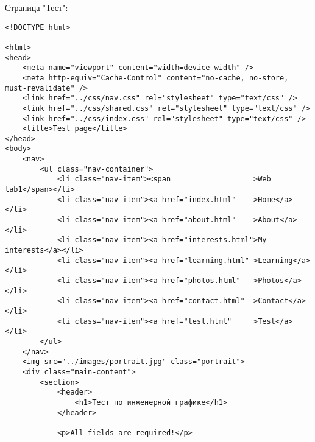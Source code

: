 Страница "Тест":
\begin{lstlisting}
<!DOCTYPE html>

<html>
<head>
    <meta name="viewport" content="width=device-width" />
    <meta http-equiv="Cache-Control" content="no-cache, no-store, must-revalidate" />
    <link href="../css/nav.css" rel="stylesheet" type="text/css" />
    <link href="../css/shared.css" rel="stylesheet" type="text/css" />
    <link href="../css/index.css" rel="stylesheet" type="text/css" />
    <title>Test page</title>
</head>
<body>
    <nav>
        <ul class="nav-container">
            <li class="nav-item"><span                   >Web lab1</span></li>
            <li class="nav-item"><a href="index.html"    >Home</a></li>
            <li class="nav-item"><a href="about.html"    >About</a></li>
            <li class="nav-item"><a href="interests.html">My interests</a></li>
            <li class="nav-item"><a href="learning.html" >Learning</a></li>
            <li class="nav-item"><a href="photos.html"   >Photos</a></li>
            <li class="nav-item"><a href="contact.html"  >Contact</a></li>
            <li class="nav-item"><a href="test.html"     >Test</a></li>
        </ul>
    </nav>
    <img src="../images/portrait.jpg" class="portrait">
    <div class="main-content">
        <section>   
            <header>
                <h1>Тест по инженерной графике</h1>
            </header>

            <p>All fields are required!</p>


\end{lstlisting}
